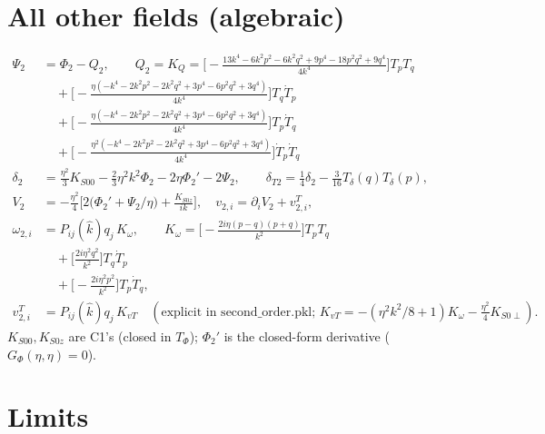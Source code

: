 \documentclass[10pt]{article}
\begin{document}
\section{All other fields (algebraic)}\label{sec:alg}
\begin{align}
\Psi_2&=\Phi_2-Q_2,\qquad Q_2=K_Q= \Big[- \frac{13 k^{4} - 6 k^{2} p^{2} - 6 k^{2} q^{2} + 9 p^{4} - 18 p^{2} q^{2} + 9 q^{4}}{4 k^{4}}\Big] T_{p} T_{q} \\ &\quad + \Big[- \frac{\eta \left(- k^{4} - 2 k^{2} p^{2} - 2 k^{2} q^{2} + 3 p^{4} - 6 p^{2} q^{2} + 3 q^{4}\right)}{4 k^{4}}\Big] T_{q} \dot{T}_p \\ &\quad + \Big[- \frac{\eta \left(- k^{4} - 2 k^{2} p^{2} - 2 k^{2} q^{2} + 3 p^{4} - 6 p^{2} q^{2} + 3 q^{4}\right)}{4 k^{4}}\Big] T_{p} \dot{T}_q \\ &\quad + \Big[- \frac{\eta^{2} \left(- k^{4} - 2 k^{2} p^{2} - 2 k^{2} q^{2} + 3 p^{4} - 6 p^{2} q^{2} + 3 q^{4}\right)}{4 k^{4}}\Big] \dot{T}_p \dot{T}_q\\
\delta_2&=\tfrac{\eta^2}{3}K_{S00}-\tfrac23\eta^2k^2\Phi_2-2\eta\Phi_2'-2\Psi_2,\qquad
\delta_{T2}=\tfrac14\delta_2-\tfrac3{16}T_\delta(q)T_\delta(p),\\
V_2&=-\tfrac{\eta^2}{4}\Big[2\big(\Phi_2'+\Psi_2/\eta\big)+\frac{K_{S0z}}{ik}\Big],\quad v_{2,i}=\partial_iV_2+v^T_{2,i},\\
\omega_{2,i}&=P_{ij}(\hat k)q_j\,K_\omega,\qquad K_\omega= \Big[- \frac{2 i \eta \left(p - q\right) \left(p + q\right)}{k^{2}}\Big] T_{p} T_{q} \\ &\quad + \Big[\frac{2 i \eta^{2} q^{2}}{k^{2}}\Big] T_{q} \dot{T}_p \\ &\quad + \Big[- \frac{2 i \eta^{2} p^{2}}{k^{2}}\Big] T_{p} \dot{T}_q,\\
v^T_{2,i}&=P_{ij}(\hat k)q_j\,K_{vT}\quad(\text{explicit in second\_order.pkl; } K_{vT}=-(\eta^2k^2/8+1)K_\omega-\tfrac{\eta^2}{4}K_{S0\perp}).
\end{align}
$K_{S00},K_{S0z}$ are C1's (closed in $T_\Phi$); $\Phi_2'$ is the closed-form derivative ($G_\Phi(\eta,\eta)=0$).

\section{Limits}
\end{document}
